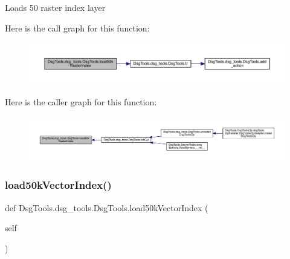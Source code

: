 \begin{DoxyVerb}Loads 50 raster index layer
\end{DoxyVerb}
 Here is the call graph for this function\+:
\nopagebreak
\begin{figure}[H]
\begin{center}
\leavevmode
\includegraphics[width=350pt]{class_dsg_tools_1_1dsg__tools_1_1_dsg_tools_a465d10a952bbd6c4ff805e8529ed0f9e_cgraph}
\end{center}
\end{figure}
Here is the caller graph for this function\+:
\nopagebreak
\begin{figure}[H]
\begin{center}
\leavevmode
\includegraphics[width=350pt]{class_dsg_tools_1_1dsg__tools_1_1_dsg_tools_a465d10a952bbd6c4ff805e8529ed0f9e_icgraph}
\end{center}
\end{figure}
\mbox{\label{class_dsg_tools_1_1dsg__tools_1_1_dsg_tools_af55fd850831c991ddd9e25af77bc8c97}} 
\subsubsection{\texorpdfstring{load50k\+Vector\+Index()}{load50kVectorIndex()}}
{\footnotesize\ttfamily def Dsg\+Tools.\+dsg\+\_\+tools.\+Dsg\+Tools.\+load50k\+Vector\+Index (\begin{DoxyParamCaption}\item[{}]{self }\end{DoxyParamCaption})}

